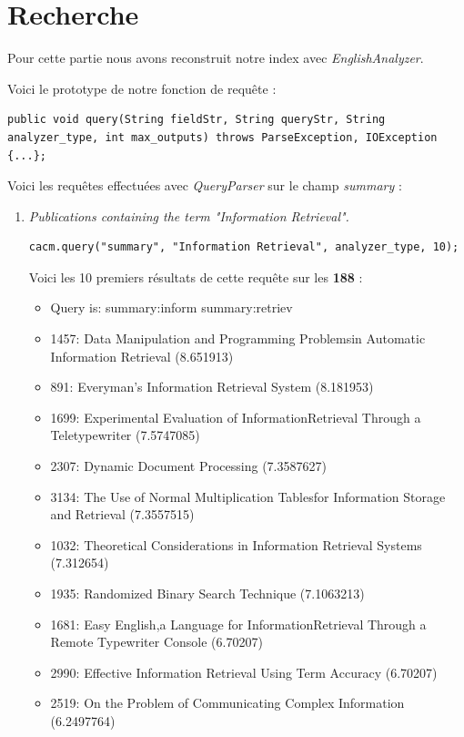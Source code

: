 \section{Recherche}

Pour cette partie nous avons reconstruit notre index avec \textit{EnglishAnalyzer}.

Voici le prototype de notre fonction de requête :
\lstset{numbers=none}
\begin{lstlisting}
public void query(String fieldStr, String queryStr, String analyzer_type, int max_outputs) throws ParseException, IOException {...};
\end{lstlisting}

Voici les requêtes effectuées avec \textit{QueryParser} sur le champ \textit{summary} :

\begin{enumerate}

\item \textit{Publications containing the term "Information Retrieval".}

\begin{lstlisting}
cacm.query("summary", "Information Retrieval", analyzer_type, 10);
\end{lstlisting}

Voici les 10 premiers résultats de cette requête sur les \textbf{188} :

\begin{itemize}
    \item Query is: summary:inform summary:retriev
    \item 1457: Data Manipulation and Programming Problemsin Automatic Information Retrieval (8.651913)
    \item 891: Everyman's Information Retrieval System (8.181953)
    \item 1699: Experimental Evaluation of InformationRetrieval Through a Teletypewriter (7.5747085)
    \item 2307: Dynamic Document Processing (7.3587627)
    \item 3134: The Use of Normal Multiplication Tablesfor Information Storage and Retrieval (7.3557515)
    \item 1032: Theoretical Considerations in Information Retrieval Systems (7.312654)
    \item 1935: Randomized Binary Search Technique (7.1063213)
    \item 1681: Easy English,a Language for InformationRetrieval Through a Remote Typewriter Console (6.70207)
    \item 2990: Effective Information Retrieval Using Term Accuracy (6.70207)
    \item 2519: On the Problem of Communicating Complex Information (6.2497764)\\
\end{itemize}


\end{enumerate}
